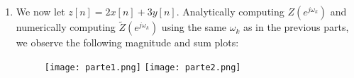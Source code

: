 \documentclass[11pt]{article}
\begin{document}
\begin{enumerate}[label=\textbf{\alph*)}, leftmargin=2.6em]
    \item We now let $z[n] = 2x[n] + 3y[n]$. Analytically computing $Z(e^{j\omega_k})$ and numerically computing
    $\tilde Z(e^{j\omega_k})$ using the same $\omega_k$ as in the previous parts, we observe the following
    magnitude and sum plots:
    \begin{figure} [H]
        \centering
        \texttt{[image: parte1.png]}
        \texttt{[image: parte2.png]}
    \end{figure}


\end{enumerate}
\end{document}
